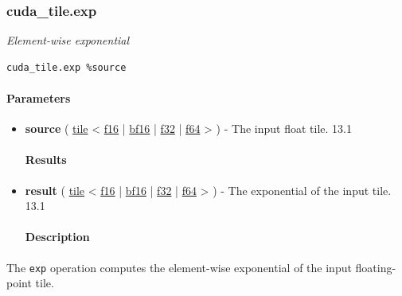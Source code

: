 \documentclass{article}
\begin{document}
\subsubsection{cuda\_tile.exp}

\textit{Element-wise exponential}


\begin{lstlisting}
cuda_tile.exp %source
\end{lstlisting}

\paragraph{Parameters}

\begin{itemize}
\item \textbf{source} ( \href{https://docs.nvidia.com/cuda/tile-ir/latest/sections/types.html#type-tile}{tile} < \href{https://docs.nvidia.com/cuda/tile-ir/latest/sections/types.html#subsection-element-types}{f16} | \href{https://docs.nvidia.com/cuda/tile-ir/latest/sections/types.html#subsection-element-types}{bf16} | \href{https://docs.nvidia.com/cuda/tile-ir/latest/sections/types.html#subsection-element-types}{f32} | \href{https://docs.nvidia.com/cuda/tile-ir/latest/sections/types.html#subsection-element-types}{f64} > ) - The input float tile. 13.1


\paragraph{Results}

\item \textbf{result} ( \href{https://docs.nvidia.com/cuda/tile-ir/latest/sections/types.html#type-tile}{tile} < \href{https://docs.nvidia.com/cuda/tile-ir/latest/sections/types.html#subsection-element-types}{f16} | \href{https://docs.nvidia.com/cuda/tile-ir/latest/sections/types.html#subsection-element-types}{bf16} | \href{https://docs.nvidia.com/cuda/tile-ir/latest/sections/types.html#subsection-element-types}{f32} | \href{https://docs.nvidia.com/cuda/tile-ir/latest/sections/types.html#subsection-element-types}{f64} > ) - The exponential of the input tile. 13.1


\paragraph{Description}

\end{itemize}
The \texttt{exp} operation computes the element-wise exponential of the input floating-point tile.
\end{document}
